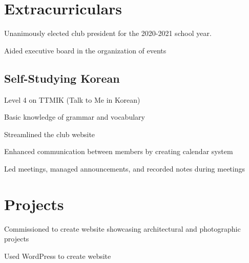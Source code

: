 \documentclass[]{deedy-resume-openfont}
\begin{document}
\begin{minipage}[t]{0.66\textwidth}

\section{Extracurriculars}

\begin{tightemize}
\item Unanimously elected club president for the 2020-2021 school year.
\item Aided executive board in the organization of events
\end{tightemize}
\sectionsep

\subsection{Self-Studying Korean}

\begin{tightemize}
\item Level 4 on TTMIK (Talk to Me in Korean)
\item Basic knowledge of grammar and vocabulary
\end{tightemize}
\sectionsep


\begin{tightemize}
\item Streamlined the club website
\item Enhanced communication between members by creating calendar system
\item Led meetings, managed announcements, and recorded notes during meetings
\end{tightemize}
\sectionsep


\section{Projects}
\begin{tightemize}
\item Commissioned to create website showcasing architectural and photographic projects
\item Used WordPress to create website
\end{tightemize}
\sectionsep


\end{minipage}
\end{document}
